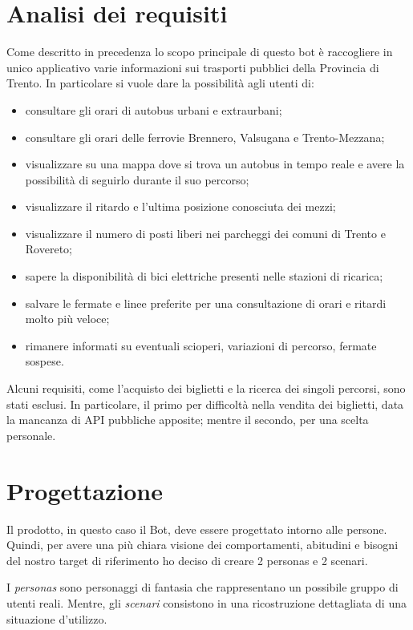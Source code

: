 \pagebreak

\section{Analisi dei requisiti}
\label{sec:requisiti}

Come descritto in precedenza lo scopo principale di questo bot è raccogliere in unico applicativo varie informazioni sui trasporti pubblici della Provincia di Trento. 
In particolare si vuole dare la possibilità agli utenti di:
\begin{itemize}
\item consultare gli orari di autobus urbani e extraurbani;
\item consultare gli orari delle ferrovie Brennero, Valsugana e Trento-Mezzana;
\item visualizzare su una mappa dove si trova un autobus in tempo reale e avere la possibilità di seguirlo durante il suo percorso;
\item visualizzare il ritardo e l'ultima posizione conosciuta dei mezzi;
\item visualizzare il numero di posti liberi nei parcheggi dei comuni di Trento e Rovereto;
\item sapere la disponibilità di bici elettriche presenti nelle stazioni di ricarica;
\item salvare le fermate e linee preferite per una consultazione di orari e ritardi molto più veloce;
\item rimanere informati su eventuali scioperi, variazioni di percorso, fermate sospese.
\end{itemize}

Alcuni requisiti, come l'acquisto dei biglietti e la ricerca dei singoli percorsi, sono stati esclusi. In particolare, il primo per difficoltà nella vendita dei biglietti, data la mancanza di API pubbliche apposite; mentre il secondo, per una scelta personale. 




\section{Progettazione}
\label{sec:progettazione}

Il prodotto, in questo caso il Bot, deve essere progettato intorno alle persone. Quindi, per avere una più chiara visione dei comportamenti, abitudini e bisogni del nostro target di riferimento ho deciso di creare 2 personas e 2 scenari.

I \textit{personas} sono personaggi di fantasia che rappresentano un possibile gruppo di utenti reali. Mentre, gli \textit{scenari} consistono in una ricostruzione dettagliata di una situazione d'utilizzo. 

